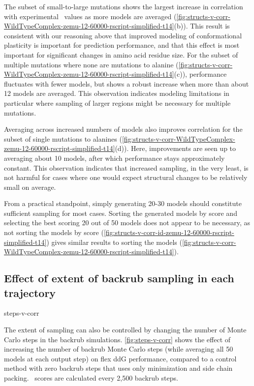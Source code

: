 The subset of small-to-large mutations shows the largest increase in correlation with experimental \ddg\ values as more models are averaged (\cref{fig:structs-v-corr-WildTypeComplex-zemu-12-60000-rscript-simplified-t14}(b)). This result is consistent with our reasoning above that improved modeling of conformational plasticity is important for prediction performance, and that this effect is most important for significant changes in amino acid residue size. For the subset of multiple mutations where none are mutations to alanine (\cref{fig:structs-v-corr-WildTypeComplex-zemu-12-60000-rscript-simplified-t14}(c)), performance fluctuates with fewer models, but shows a robust increase when more than about 12 models are averaged. This observation indicates modeling limitations in particular where sampling of larger regions might be necessary for multiple mutations.

Averaging across increased numbers of models also improves correlation for the subset of single mutations to alanines (\cref{fig:structs-v-corr-WildTypeComplex-zemu-12-60000-rscript-simplified-t14}(d)).
Here, improvements are seen up to averaging about 10 models, after which performance stays approximately constant.
This observation indicates that increased sampling, in the very least, is not harmful for cases where one would expect structural changes to be relatively small on average.

From a practical standpoint, simply generating 20-30 models should constitute sufficient sampling for most cases. Sorting the generated models by score and selecting the best scoring 20 out of 50 models does not appear to be necessary, as not sorting the models by score (\cref{fig:structs-v-corr-id-zemu-12-60000-rscript-simplified-t14}) gives similar results to sorting the models (\cref{fig:structs-v-corr-WildTypeComplex-zemu-12-60000-rscript-simplified-t14}).

\subsection{Effect of extent of backrub sampling in each trajectory}

{steps-v-corr}

The extent of sampling can also be controlled by changing the number of Monte Carlo steps in the backrub simulations.
\cref{fig:steps-v-corr} shows the effect of increasing the number of backrub Monte Carlo steps (while averaging all 50 models at each output step) on flex ddG performance, compared to a control method with zero backrub steps that uses only minimization and side chain packing.
\ddg\ scores are calculated every 2,500 backrub steps.


